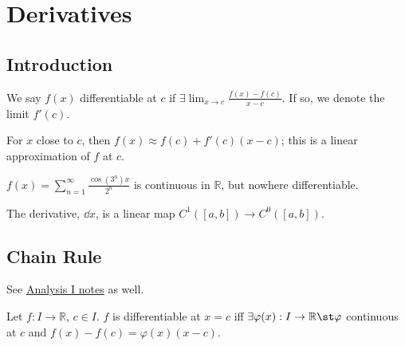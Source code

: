 \section{Derivatives}
\subsection{Introduction}

\begin{definition}[Differentiable]
    We say $f(x)$ differentiable at $c$ if $\exists \lim_{x \to c} \frac{f(x) - f(c)}{x-c}$. If so, we denote the limit $f'(c)$.
\end{definition}

\begin{remark}
    For $x$ close to $c$, then $f(x) \approx f(c) + f'(c)(x-c)$; this is a linear approximation of $f$ at $c$.
\end{remark}

\begin{example}[Weierstrass]
    $f(x) = \sum_{n=1}^\infty \frac{\cos(3^n)x}{2^n}$ is continuous in $\mathbb{R}$, but nowhere differentiable.
\end{example}
\begin{definition}
    The derivative, $\dd{x}$, is a linear map $C^1([a, b]) \to C^0([a, b])$.
\end{definition}

\subsection{Chain Rule}
\begin{remark}
    See \href{https://notes.louismeunier.net/Analysis%201/analysis.pdf#page=96}{Analysis I notes} as well.
\end{remark}
\begin{theorem}\label{thm:Caratheodory}
    Let $f: I \to \mathbb{R}$, $c \in I$. $f$ is differentiable at $x = c$ iff $\exists \varphi(x) : I \to \mathbb{R} \st \varphi$ continuous at $c$ and $f(x) - f(c) = \varphi(x)(x - c)$.\footnotemark
\end{theorem}



